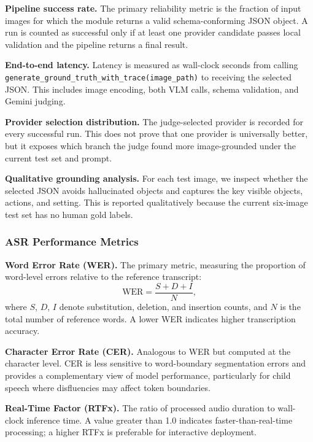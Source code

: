 \documentclass{article}
\begin{document}
\noindent\textbf{Pipeline success rate.}
The primary reliability metric is the fraction of input images for which
the module returns a valid schema-conforming JSON object. A run is
counted as successful only if at least one provider candidate passes
local validation and the pipeline returns a final result.

\noindent\textbf{End-to-end latency.}
Latency is measured as wall-clock seconds from calling
\texttt{generate\_ground\_truth\_with\_trace(image\_path)} to receiving
the selected JSON. This includes image encoding, both VLM calls, schema
validation, and Gemini judging.

\noindent\textbf{Provider selection distribution.}
The judge-selected provider is recorded for every successful run. This
does not prove that one provider is universally better, but it exposes
which branch the judge found more image-grounded under the current test
set and prompt.

\noindent\textbf{Qualitative grounding analysis.}
For each test image, we inspect whether the selected JSON avoids
hallucinated objects and captures the key visible objects, actions, and
setting. This is reported qualitatively because the current six-image
test set has no human gold labels.

\subsubsection{ASR Performance Metrics}
\label{sec:asr-metrics}
 
\noindent\textbf{Word Error Rate (WER).}
The primary metric, measuring the proportion of word-level errors
relative to the reference transcript:
\begin{equation}
  \text{WER} = \frac{S + D + I}{N},
  \label{eq:wer}
\end{equation}
where $S$, $D$, $I$ denote substitution, deletion, and insertion
counts, and $N$ is the total number of reference words.
A lower WER indicates higher transcription accuracy.
 
\noindent\textbf{Character Error Rate (CER).}
Analogous to WER but computed at the character level.
CER is less sensitive to word-boundary segmentation errors and
provides a complementary view of model performance, particularly
for child speech where disfluencies may affect token boundaries.
 
\noindent\textbf{Real-Time Factor (RTFx).}
The ratio of processed audio duration to wall-clock inference time.
A value greater than 1.0 indicates faster-than-real-time processing;
a higher RTFx is preferable for interactive deployment.
\end{document}
